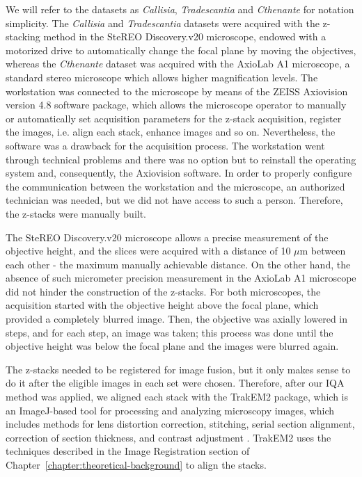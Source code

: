 We will refer to the datasets as \textit{Callisia}, \textit{Tradescantia} and \textit{Cthenante} for notation simplicity. The \textit{Callisia} and \textit{Tradescantia} datasets were acquired with the z-stacking method in the SteREO Discovery.v20 microscope, endowed with a motorized drive to automatically change the focal plane by moving the objectives, whereas the \textit{Cthenante} dataset was acquired with the AxioLab A1 microscope, a standard stereo microscope which allows higher magnification levels. The workstation was connected to the microscope by means of the ZEISS Axiovision version 4.8 software package, which allows the microscope operator to manually or automatically set acquisition parameters for the z-stack acquisition, register the images, i.e. align each stack, enhance images and so on. Nevertheless, the software was a drawback for the acquisition process. The workstation went through technical problems and there was no option but to reinstall the operating system and, consequently, the Axiovision software. In order to properly configure the communication between the workstation and the microscope, an authorized technician was needed, but we did not have access to such a person. Therefore, the z-stacks were manually built.

The SteREO Discovery.v20 microscope allows a precise measurement of the objective height, and the slices were acquired with a distance of 10 $\mu$m between each other - the maximum manually achievable distance. On the other hand, the absence of such micrometer precision measurement in the AxioLab A1 microscope did not hinder the construction of the z-stacks. For both microscopes, the acquisition started with the objective height above the focal plane, which provided a completely blurred image. Then, the objective was axially lowered in steps, and for each step, an image was taken; this process was done until the objective height was below the focal plane and the images were blurred again.

The z-stacks needed to be registered for image fusion, but it only makes sense to do it after the eligible images in each set were chosen. Therefore, after our IQA method was applied, we aligned each stack with the TrakEM2 package, which is an ImageJ-based tool for processing and analyzing microscopy images, which includes methods for lens distortion correction, stitching, serial section alignment, correction of section thickness, and contrast adjustment \cite{saalfeld2019computational}. TrakEM2 uses the techniques described in the Image Registration section of Chapter~\ref{chapter:theoretical-background} to align the stacks.

